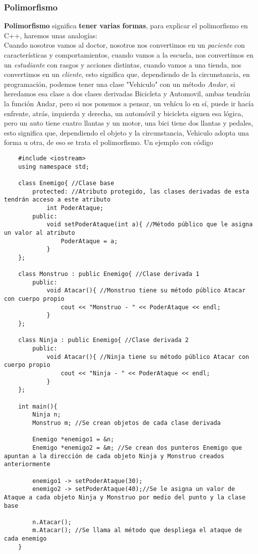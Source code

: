 \subsubsection{Polimorfismo}
\textbf{Polimorfismo} significa \textbf{tener varias formas}, para explicar el polimorfismo en C++, haremos unas analogías:\\
Cuando nosotros vamos al doctor, nosotros nos convertimos en un \textit{paciente} con características y comportamientos, cuando vamos a la escuela, nos convertimos en un \textit{estudiante} con rasgos y acciones distintas, cuando vamos a una tienda, nos convertimos en un \textit{cliente}, esto significa que, dependiendo de la circunstancia, en programación, podemos tener una clase "Vehiculo" con un método \textit{Andar}, si heredamos esa clase a dos clases derivadas Bicicleta y Automovil, ambas tendrán la función Andar, pero si nos ponemos a pensar, un vehícu  lo en sí, puede ir hacía enfrente, atrás, izquierda y derecha, un automóvil y bicicleta siguen esa lógica, pero un auto tiene cuatro llantas y un motor, una bici tiene dos llantas y pedales, esto significa que, dependiendo el objeto y la circunstancia, Vehiculo adopta una forma u otra, de eso se trata el polimorfismo. Un ejemplo con código
\begin{lstlisting}
    #include <iostream>
    using namespace std;
    
    class Enemigo{ //Clase base
        protected: //Atributo protegido, las clases derivadas de esta tendrán acceso a este atributo
            int PoderAtaque;
        public:
            void setPoderAtaque(int a){ //Método público que le asigna un valor al atributo
                PoderAtaque = a;
            }
    };
    
    class Monstruo : public Enemigo{ //Clase derivada 1
        public:
            void Atacar(){ //Monstruo tiene su método público Atacar con cuerpo propio
                cout << "Monstruo - " << PoderAtaque << endl;
            }
    };
    
    class Ninja : public Enemigo{ //Clase derivada 2
        public:
            void Atacar(){ //Ninja tiene su método público Atacar con cuerpo propio
                cout << "Ninja - " << PoderAtaque << endl;
            }
    };
    
    int main(){
        Ninja n;
        Monstruo m; //Se crean objetos de cada clase derivada
        
        Enemigo *enemigo1 = &n;
        Enemigo *enemigo2 = &m; //Se crean dos punteros Enemigo que apuntan a la dirección de cada objeto Ninja y Monstruo creados anteriormente
        
        enemigo1 -> setPoderAtaque(30);
        enemigo2 -> setPoderAtaque(40);//Se le asigna un valor de Ataque a cada objeto Ninja y Monstruo por medio del punto y la clase base
        
        n.Atacar();
        m.Atacar(); //Se llama al método que despliega el ataque de cada enemigo
    }
\end{lstlisting}
